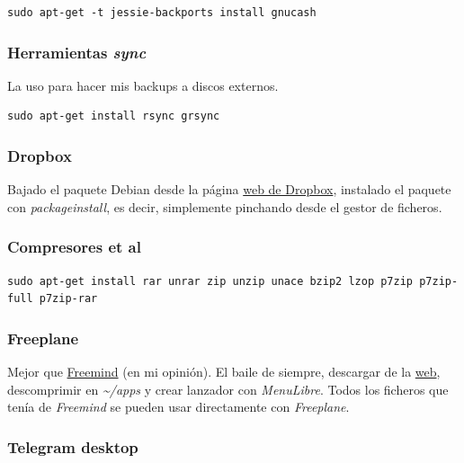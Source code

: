 \documentclass[12pt,spanish,]{scrartcl}
\begin{document}
\begin{verbatim}
sudo apt-get -t jessie-backports install gnucash
\end{verbatim}

\subsubsection{\texorpdfstring{Herramientas
\emph{sync}}{Herramientas sync}}\label{herramientas-sync}

La uso para hacer mis backups a discos externos.

\begin{verbatim}
sudo apt-get install rsync grsync
\end{verbatim}

\subsubsection{Dropbox}\label{dropbox}

Bajado el paquete Debian desde la página
\href{https://www.dropbox.com/install-linux}{web de Dropbox}, instalado
el paquete con \emph{packageinstall}, es decir, simplemente pinchando
desde el gestor de ficheros.

\subsubsection{Compresores et al}\label{compresores-et-al}

\begin{verbatim}
sudo apt-get install rar unrar zip unzip unace bzip2 lzop p7zip p7zip-full p7zip-rar
\end{verbatim}

\subsubsection{Freeplane}\label{freeplane}

Mejor que
\href{http://freemind.sourceforge.net/wiki/index.php/Main_Page}{Freemind}
(en mi opinión). El baile de siempre, descargar de la
\href{http://www.freeplane.org/}{web}, descomprimir en
\emph{\textasciitilde{}/apps} y crear lanzador con \emph{MenuLibre}.
Todos los ficheros que tenía de \emph{Freemind} se pueden usar
directamente con \emph{Freeplane}.

\subsubsection{Telegram desktop}\label{telegram-desktop}
\end{document}
